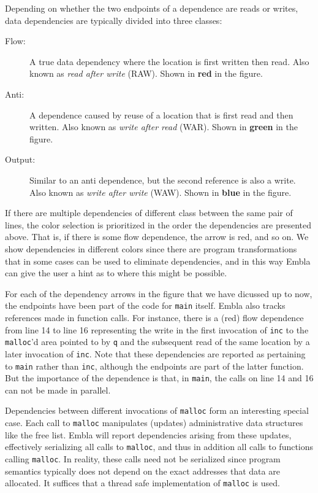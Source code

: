 \documentclass{acm_proc_article-sp}
\begin{document}
Depending on whether the two endpoints of a dependence
are reads or writes, data dependencies are typically divided into 
three classes:
\begin{description}
\item[Flow:]
A true data dependency where the location is first written then
read. Also known as {\em read after write} (RAW). Shown in 
{\bf \color{red} red} in the figure.
\item[Anti:]
A dependence caused by reuse of a location that is first read and then
written. Also known as {\em write after read} (WAR). Shown in 
{\bf \color{green} green} in the figure.
\item[Output:]
Similar to an anti dependence, but the second reference is also a
write. Also known as {\em write after write} (WAW). Shown in 
{\bf \color{blue} blue} in the figure.
\end{description}
If there are multiple dependencies of different class between the 
same pair of lines, the color selection is prioritized in the
order the dependencies are presented above. That is, if there is
some flow dependence, the arrow is red, and so on. 
We show dependencies in different colors since there are program
transformations that in some cases can be used to eliminate 
dependencies, and in this way Embla can give the user a hint as 
to where this might be possible.

For each of the dependency arrows in the figure that 
we have dicussed up to now, the endpoints have been part of the 
code for {\tt main}
itself. Embla also tracks references made in function calls. For
instance, there is a (red) flow dependence from line 14 to line 16
representing the write in the first invocation of {\tt inc} to the 
{\tt malloc}'d area pointed to by {\tt q} and the subsequent read 
of the same location by a later invocation of {\tt inc}. 
Note that these dependencies 
are reported as pertaining to {\tt main} rather than {\tt inc},
although the endpoints are part of the latter function. 
But the importance of the dependence is that, in {\tt main}, the calls
on line 14 and 16 can not be made in parallel.

Dependencies between different invocations of {\tt malloc} form 
an interesting special case.
Each call to {\tt malloc} manipulates (updates) 
administrative data structures like the free list. Embla will
report dependencies arising from these updates, 
effectively serializing all calls to 
{\tt malloc}, and thus in addition all calls to functions calling
{\tt malloc}. In reality, these calls need not be serialized since
program semantics typically does not depend on the exact addresses 
that data are allocated. It suffices that a thread safe 
implementation of {\tt malloc} is used.
\end{document}

